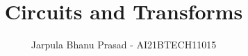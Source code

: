 \documentclass[journal,12pt,twocolumn]{IEEEtran}
\begin{document}
\let\StandardTheFigure\thefigure
\renewcommand{\thefigure}{\theproblem}



\def\putbox#1#2#3{\makebox[0in][l]{\makebox[#1][l]{}\raisebox{\baselineskip}[0in][0in]{\raisebox{#2}[0in][0in]{#3}}}}
     \def\rightbox#1{\makebox[0in][r]{#1}}
     \def\centbox#1{\makebox[0in]{#1}}
     \def\topbox#1{\raisebox{-\baselineskip}[0in][0in]{#1}}
     \def\midbox#1{\raisebox{-0.5\baselineskip}[0in][0in]{#1}}

\vspace{3cm}

\title{ 
Circuits and Transforms
}


%
%
%

\author{Jarpula Bhanu Prasad - AI21BTECH11015} %
% 
%
\end{document}
